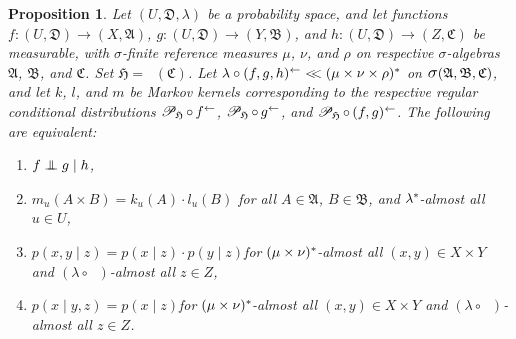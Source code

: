 \documentclass[
twoside=true,
paper=letter,
fontsize=9pt,
pagesize=auto,
leqno,
openany,
headsepline,
overfullrule,
]{scrbook}
\theoremstyle{plain}
\theoremstyle{plain}
\newtheorem{prop}[thm]{Proposition}
\theoremstyle{definition}
\theoremstyle{bfnoteitalic}
\theoremstyle{bfnoteroman}
\newcommand{\sigalg}[1]{\mathfrak{#1}}
\newcommand{\cali}[1]{\mathscr{#1}}
\newcommand{\condprobop}[1]{\mathop{\cali{P}\hspace{-1pt}}\nolimits_{#1}}
\newcommand{\sagb}{\mathop{\hbox{\large{$\sigma$}}}\nolimits}
\newcommand{\textsigma}{\hbox{\large{$\sigma$}}\kern-1pt}
\newcommand{\preimage}[1]{\mathop{#1^{\leftarrow}}}
\newcommand{\sigmaalgebra}{\sigalg{A}}
\newcommand{\sigmaalgebraii}{\sigalg{B}}
\newcommand{\sigmaalgebraiii}{\sigalg{C}}
\newcommand{\productsig}[2]{\sagb(#1,#2)}
\newcommand{\kernast}{\ast\kern-1pt}
\newcommand{\funcf}{f}
\newcommand{\funcg}{g}
\newcommand{\funch}{h}
\newcommand{\funck}{k}
\newcommand{\funcl}{l}
\newcommand{\funcm}{m}
\newcommand{\function}{f}
\newcommand{\functionii}{g}
\newcommand{\functioniii}{h}
\newcommand{\measurespace}{X}
\newcommand{\measurespaceii}{Y}
\newcommand{\measurespaceiii}{Z}
\newcommand{\mspaceelt}{x}
\newcommand{\mspaceeltii}{y}
\newcommand{\mspaceeltiii}{z}
\newcommand{\abscont}{\mathrel{< \kern-3.5pt <}}
\newcommand{\measure}{\mu}
\newcommand{\measmu}{\mu}
\newcommand{\measureii}{\nu}
\newcommand{\measnu}{\nu}
\newcommand{\measureiii}{\lambda}
\newcommand{\measlambda}{\lambda}
\newcommand{\measureiv}{\rho}
\newcommand{\seti}{A}
\newcommand{\setii}{B}
\newcommand{\uspace}{U}%
\newcommand{\uspaceelt}{u}
\newcommand{\uspacesig}{\sigalg{D}}
\newcommand{\condindep}[3]{#1\perp\kern-6pt\perp #2\mid #3}
\begin{document}
\begin{prop}\label{conditional_independence_equivalence}
Let
$(\uspace,\uspacesig,\measlambda)$
be a probability space, and let functions
$\function:(\uspace,\uspacesig)\to (\measurespace,\sigmaalgebra)$,
$\functionii:(\uspace,\uspacesig)\to (\measurespaceii,\sigmaalgebraii)$,
and
$\functioniii:(\uspace,\uspacesig)\to (\measurespaceiii,\sigmaalgebraiii)$
be measurable, with \textsigma-finite reference measures
$\measure$, $\measureii$, and $\measureiv$ on respective \textsigma-algebras
$\sigmaalgebra$, $\sigmaalgebraii$, and $\sigmaalgebraiii$.
Set $\sigalg{H}=\preimage{\funch}(\sigmaalgebraiii)$.
Let
$\measureiii\circ\preimage{(\function,\functionii,\functioniii)}
\abscont
(\measure\times\measureii\times\measureiv)^*$ on
$\productsig{\sigmaalgebra}{\sigmaalgebraii,\sigmaalgebraiii}$,
and let
$\funck$,
$\funcl$,
and
$\funcm$
be Markov kernels corresponding to the respective regular conditional distributions
$\condprobop{\sigalg{H}}\circ \preimage{\funcf}$,
$\condprobop{\sigalg{H}}\circ \preimage{\funcg}$,
and
$\condprobop{\sigalg{H}} \circ \preimage{(\funcf,\funcg)}$.
The following are equivalent:
%
\begin{enumerate}
\item[1)]
$\condindep{\function}{\functionii}{\functioniii}$, 
%
\item[2)]
$\funcm_\uspaceelt
(\seti\times\setii)
=
\funck_\uspaceelt(\seti)
\cdot
\funcl_\uspaceelt(\setii)$\quad
for all $\seti\in\sigmaalgebra$, $\setii\in\sigmaalgebraii$, and $\measlambda^\kernast$\hyp{}almost all
$\uspaceelt\in\uspace$,
%
\item[3)]
$p(\mspaceelt,\mspaceeltii\mid\mspaceeltiii)
= 
p(\mspaceelt\mid\mspaceeltiii)
\cdot
p(\mspaceeltii\mid\mspaceeltiii)$\quad for
$(\measmu\times\measnu)^\kernast$\hyp{}almost all
$(x,y)\in\measurespace\times\measurespaceii$ and
$(\measlambda\circ\preimage{\funch})$\hyp{}almost all $\mspaceeltiii\in\measurespaceiii$,
%
\item[4)]
$p(\mspaceelt\mid \mspaceeltii,\mspaceeltiii)
= 
p(\mspaceelt\mid\mspaceeltiii)$\quad for
$(\measmu\times\measnu)^\kernast$\hyp{}almost all
$(x,y)\in\measurespace\times\measurespaceii$ and
$(\measlambda\circ\preimage{\funch})$\hyp{}almost all $\mspaceeltiii\in\measurespaceiii$.
\end{enumerate}
\end{prop}
\end{document}
